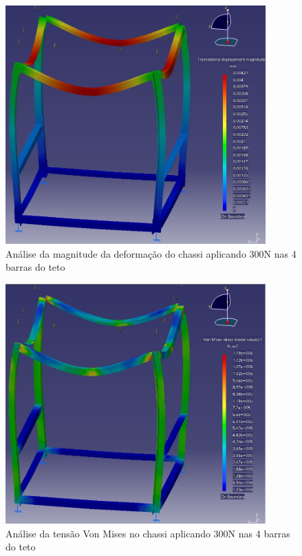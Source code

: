 \begin{figure}[H]
	\centering
	\includegraphics[width=10cm]{figuras/catia5.jpg}
	\caption{Análise da magnitude da deformação do chassi aplicando 300N nas 4 barras do teto}
	\label{fig:catia5}
\end{figure}
\begin{figure}[H]
	\centering
	\includegraphics[width=10cm]{figuras/catia6.jpg}
	\caption{Análise da tensão Von Mises no chassi aplicando 300N nas 4 barras do teto}
	\label{fig:catia6}
\end{figure}
